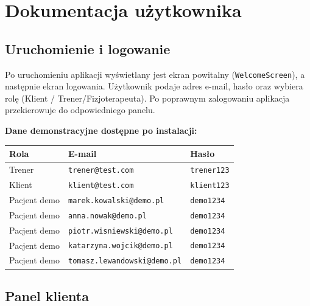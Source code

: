 \documentclass[12pt,a4paper]{article}
\begin{document}
\section{Dokumentacja użytkownika}

\subsection{Uruchomienie i logowanie}

Po uruchomieniu aplikacji wyświetlany jest ekran powitalny (\texttt{WelcomeScreen}), a następnie ekran logowania. Użytkownik podaje adres e-mail, hasło oraz wybiera rolę (Klient / Trener/Fizjoterapeuta). Po poprawnym zalogowaniu aplikacja przekierowuje do odpowiedniego panelu.

\textbf{Dane demonstracyjne dostępne po instalacji:}

\begin{center}
\begin{tabular}{lll}
  \toprule
  \textbf{Rola} & \textbf{E-mail} & \textbf{Hasło} \\
  \midrule
  Trener        & \texttt{trener@test.com}            & \texttt{trener123} \\
  Klient        & \texttt{klient@test.com}            & \texttt{klient123} \\
  Pacjent demo  & \texttt{marek.kowalski@demo.pl}     & \texttt{demo1234} \\
  Pacjent demo  & \texttt{anna.nowak@demo.pl}         & \texttt{demo1234} \\
  Pacjent demo  & \texttt{piotr.wisniewski@demo.pl}   & \texttt{demo1234} \\
  Pacjent demo  & \texttt{katarzyna.wojcik@demo.pl}   & \texttt{demo1234} \\
  Pacjent demo  & \texttt{tomasz.lewandowski@demo.pl} & \texttt{demo1234} \\
  \bottomrule
\end{tabular}
\end{center}

\subsection{Panel klienta}
\end{document}
